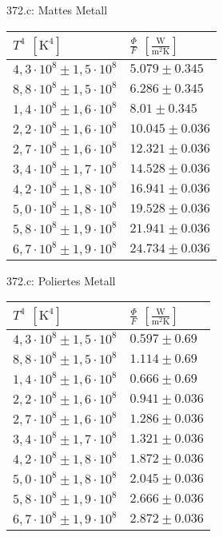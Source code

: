 \documentclass[a4paper,12pt]{article}
\begin{document}
\noindent 372.c: Mattes Metall\\
\begin{tabular}{ ll }
        $T^4$ $[\text{K}^4]$ & $\tfrac{\Phi }{F}$ $[\tfrac{\text{W}}{\text{m}^2\text{K}}]$ \\
        \hline
        $4,3\cdot 10^8\pm 1,5\cdot 10^8 $& $5.079 \pm 0.345$ \\
        $8,8\cdot 10^8\pm 1,5\cdot 10^8 $& $6.286 \pm 0.345$ \\
        $1,4\cdot 10^8\pm 1,6\cdot 10^8 $& $8.01 \pm 0.345$ \\
        $2,2\cdot 10^8\pm 1,6\cdot 10^8 $& $10.045 \pm 0.036$ \\
        $2,7\cdot 10^8\pm 1,6\cdot 10^8 $& $12.321 \pm 0.036$ \\
        $3,4\cdot 10^8\pm 1,7\cdot 10^8 $& $14.528 \pm 0.036$ \\
        $4,2\cdot 10^8\pm 1,8\cdot 10^8 $& $16.941 \pm 0.036$ \\
        $5,0\cdot 10^8\pm 1,8\cdot 10^8 $& $19.528 \pm 0.036$ \\
        $5,8\cdot 10^8\pm 1,9\cdot 10^8 $& $21.941 \pm 0.036$ \\
        $6,7\cdot 10^8\pm 1,9\cdot 10^8 $& $24.734 \pm 0.036$ \\
\end{tabular}
\newpage
\noindent 372.c: Poliertes Metall\\
\begin{tabular}{ ll }
        $T^4$ $[\text{K}^4]$ & $\tfrac{\Phi }{F}$ $[\tfrac{\text{W}}{\text{m}^2\text{K}}]$ \\
        \hline
        $4,3\cdot 10^8\pm 1,5\cdot 10^8 $& $0.597 \pm 0.69$ \\
        $8,8\cdot 10^8\pm 1,5\cdot 10^8 $& $1.114 \pm 0.69$ \\
        $1,4\cdot 10^8\pm 1,6\cdot 10^8 $& $0.666 \pm 0.69$ \\
        $2,2\cdot 10^8\pm 1,6\cdot 10^8 $& $0.941 \pm 0.036$ \\
        $2,7\cdot 10^8\pm 1,6\cdot 10^8 $& $1.286 \pm 0.036$ \\
        $3,4\cdot 10^8\pm 1,7\cdot 10^8 $& $1.321 \pm 0.036$ \\
        $4,2\cdot 10^8\pm 1,8\cdot 10^8 $& $1.872 \pm 0.036$ \\
        $5,0\cdot 10^8\pm 1,8\cdot 10^8 $& $2.045 \pm 0.036$ \\
        $5,8\cdot 10^8\pm 1,9\cdot 10^8 $& $2.666 \pm 0.036$ \\
        $6,7\cdot 10^8\pm 1,9\cdot 10^8 $& $2.872 \pm 0.036$ 
\end{tabular}
\end{document}

